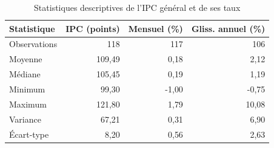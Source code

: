 \begin{table}[!htbp]
\centering\small
\caption{Statistiques descriptives de l'IPC général et de ses taux}\label{tab:descriptif}
\begin{tabular}{lrrr}
\hline
Statistique & IPC (points) & Mensuel (\%) & Gliss. annuel (\%) \\
\hline
Observations & 118 & 117 & 106 \\
Moyenne & 109{,}49 & 0{,}18 & 2{,}12 \\
Médiane & 105{,}45 & 0{,}19 & 1{,}19 \\
Minimum & 99{,}30 & -1{,}00 & -0{,}75 \\
Maximum & 121{,}80 & 1{,}79 & 10{,}08 \\
Variance & 67{,}21 & 0{,}31 & 6{,}90 \\
Écart-type & 8{,}20 & 0{,}56 & 2{,}63 \\
\hline
\end{tabular}
\end{table}
